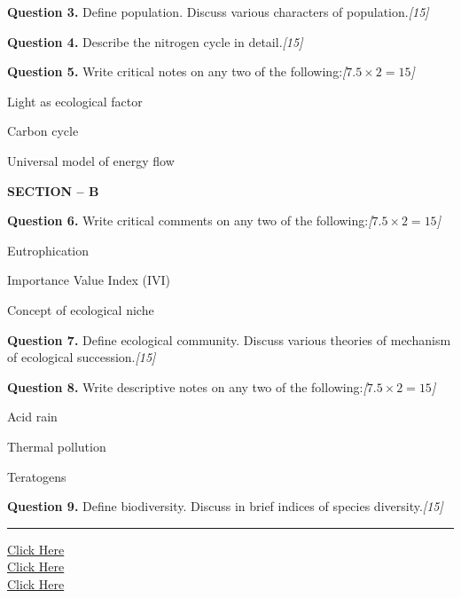 \documentclass[11pt,a4paper]{article}
\newcommand{\pts}[1]{\hfill   \textit{[#1]}}
\begin{document}
\medskip


\noindent   \textbf{Question 3.} Define population. Discuss various characters of population.\pts{15}

\medskip


\noindent   \textbf{Question 4.} Describe the nitrogen cycle in detail.\pts{15}

\medskip


\noindent   \textbf{Question 5.} Write critical notes on any two of the following:\pts{$7.5  \times 2 = 15$}

\begin{parts}
  \item Light as ecological factor
  \item Carbon cycle
  \item Universal model of energy flow
\end{parts}

\bigskip

\begin{center}
   \textbf{SECTION -- B}
\end{center}

\medskip


\noindent   \textbf{Question 6.} Write critical comments on any two of the following:\pts{$7.5  \times 2 = 15$}

\begin{parts}
  \item Eutrophication
  \item Importance Value Index (IVI)
  \item Concept of ecological niche
\end{parts}

\medskip


\noindent   \textbf{Question 7.} Define ecological community. Discuss various theories of mechanism of ecological succession.\pts{15}

\medskip


\noindent   \textbf{Question 8.} Write descriptive notes on any two of the following:\pts{$7.5  \times 2 = 15$}

\begin{parts}
  \item Acid rain
  \item Thermal pollution
  \item Teratogens
\end{parts}

\medskip


\noindent   \textbf{Question 9.} Define biodiversity. Discuss in brief indices of species diversity.\pts{15}

\vfill
\rule{\linewidth}{0.4pt}

\begin{center}\small
\href{https://bhu-exam.vercel.app/}{Click Here}\\[4pt]\href{https://me-aryan.vercel.app/}{Click Here}\\[4pt]\href{https://quashan-me.vercel.app/}{Click Here}
\end{center}
\end{document}
